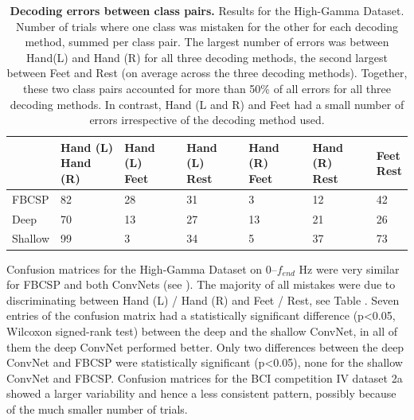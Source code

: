 \begin{table}[htb]
\centering \footnotesize
\begin{tabular}{lllllll}\toprule
&
\tableheadline{\parbox{0.12\linewidth}{Hand (L)\\Hand (R)}} & 
\tableheadline{\parbox{0.12\linewidth}{Hand (L)\\Feet}} & 
\tableheadline{\parbox{0.12\linewidth}{Hand (L)\\Rest}} & 
\tableheadline{\parbox{0.12\linewidth}{Hand (R)\\Feet}} & 
\tableheadline{\parbox{0.12\linewidth}{Hand (R)\\Rest}} & 
\tableheadline{\parbox{0.05\linewidth}{Feet\\Rest}} \\\midrule
 FBCSP & 82 & 28 & 31 & 3 & 12 & 42 \\ 
 Deep & 70 & 13 & 27 & 13 & 21 & 26 \\ 
 Shallow & 99 & 3 & 34 & 5 & 37 & 73 \\ 
  \bottomrule
\hline
\end{tabular}
\caption{\textbf{Decoding errors between class pairs.} Results for the High-Gamma Dataset.
Number of trials where one class  was mistaken for the
other for each decoding method, summed per class pair. The largest
number of errors was between Hand(L) and Hand (R) for all three
decoding methods, the second largest between Feet and Rest (on average
across the three decoding methods). Together, these two class pairs
accounted for more than 50\% of all errors for all three decoding
methods. In contrast, Hand (L and R) and Feet had a small number of
errors irrespective of the decoding method used.}
\label{hgd-class-mistakes-table} 
\end{table}

    Confusion matrices for the High-Gamma Dataset on 0--$f_{end}$ Hz were
very similar for FBCSP and both ConvNets (see
). The majority of all mistakes
were due to discriminating between Hand (L) / Hand (R) and Feet / Rest,
see Table . Seven entries of
the confusion matrix had a statistically significant difference
(p\textless0.05, Wilcoxon signed-rank test) between the deep and the
shallow ConvNet, in all of them the deep ConvNet performed better. Only
two differences between the deep ConvNet and FBCSP were statistically
significant (p\textless0.05), none for the shallow ConvNet and FBCSP.
Confusion matrices for the BCI competition IV dataset 2a showed a larger
variability and hence a less consistent pattern, possibly because of the
much smaller number of trials.

